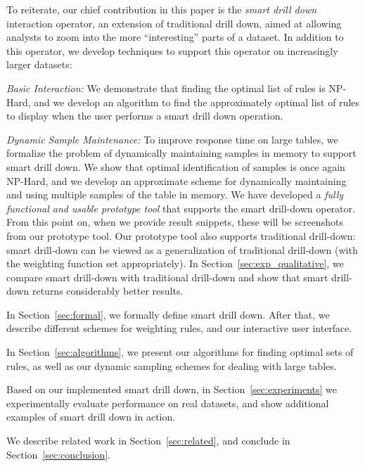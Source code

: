 To reiterate, our chief contribution in this paper is the {\em smart drill down} interaction operator,
an extension of traditional drill down, aimed at allowing analysts to zoom into the
more ``interesting'' parts of a dataset. In addition to this operator,
we develop techniques to support this operator on increasingly larger datasets:
\squishlist
\item {\em Basic Interaction:} We demonstrate that finding the optimal list of rules is {\sc NP-Hard},
and we develop an algorithm to find the approximately optimal list of rules to display when the user performs a smart drill down operation. 
\item {\em Dynamic Sample Maintenance:} To improve response time on large tables, we formalize the problem of dynamically
maintaining samples in memory to support smart drill down. 
We show that optimal identification of samples is once again {\sc NP-Hard}, and 
we develop an approximate scheme for dynamically maintaining and using multiple samples of the table in memory.
\squishend
We have developed a {\em fully functional and usable prototype tool} that supports the smart drill-down operator. From this point on, when we provide result snippets, these will be screenshots from our prototype tool. Our prototype tool also supports traditional drill-down: smart drill-down 
can be viewed as a generalization of traditional drill-down (with the weighting function set appropriately). In Section~\ref{sec:exp_qualitative}, we compare smart drill-down with traditional drill-down and show that smart drill-down returns considerably better results.

\squishlist 

\item In Section~\ref{sec:formal}, we formally define smart drill down. After that, we describe different schemes for weighting rules, and our interactive user interface.

\item In Section~\ref{sec:algorithms}, we present our algorithms for
finding optimal sets of rules, as well as our dynamic sampling schemes
for dealing with large tables.

\item Based on our implemented smart drill down,
in Section~\ref{sec:experiments} we experimentally evaluate
performance on real datasets,
and show additional examples of smart drill down in action.

\item We describe related work in Section~\ref{sec:related}, and conclude in Section~\ref{sec:conclusion}.
\squishend 
